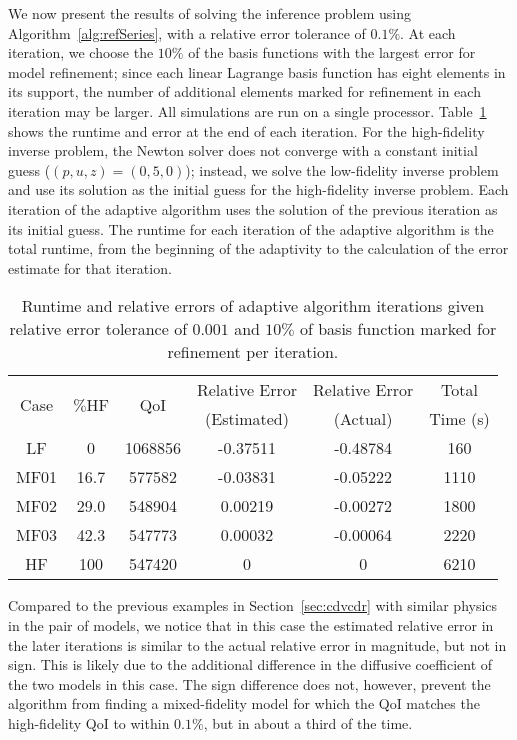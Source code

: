 We now present the results of solving the inference problem using Algorithm~\ref{alg:refSeries}, with a relative error tolerance of $0.1\%$. At each iteration, we choose the $10\%$ of the basis functions with the largest error for model refinement; since each linear Lagrange basis function has eight elements in its support, the number of additional elements marked for refinement in each iteration may be larger. All simulations are run on a single processor. Table~\ref{tab:ref3D} shows the runtime and error at the end of each iteration. For the high-fidelity inverse problem, the Newton solver does not converge with a constant initial guess ($(p,u,z)=(0,5,0)$); instead, we solve the low-fidelity inverse problem and use its solution as the initial guess for the high-fidelity inverse problem. Each iteration of the adaptive algorithm uses the solution of the previous iteration as its initial guess. The runtime for each iteration of the adaptive algorithm is the total runtime, from the beginning of the adaptivity to the calculation of the error estimate for that iteration.
%
\begin{table}[h]
\centering
\begin{tabular}{c|c|c|c|c|c}
\multirow{2}{*}{Case} & \multirow{2}{*}{$\%$HF} & \multirow{2}{*}{QoI} & Relative Error & Relative Error & Total \\ 
& & & (Estimated) & (Actual) & Time (s) \\ \hline
LF   & 0    & 1068856 & -0.37511 & -0.48784 & 160 \\
MF01 & 16.7 & 577582  & -0.03831 & -0.05222 & 1110 \\
MF02 & 29.0 & 548904  & 0.00219  & -0.00272 & 1800 \\
MF03 & 42.3 & 547773  & 0.00032  & -0.00064 & 2220 \\
HF   & 100  & 547420  & 0        & 0        & 6210 \\
\end{tabular}
\caption{Runtime and relative errors of adaptive algorithm iterations given relative error tolerance of $0.001$ and $10\%$ of basis function marked for refinement per iteration.}
\label{tab:ref3D}
\end{table}
%
Compared to the previous examples in Section~\ref{sec:cdvcdr} with similar physics in the pair of models, we notice that in this case the estimated relative error in the later iterations is similar to the actual relative error in magnitude, but not in sign. This is likely due to the additional difference in the diffusive coefficient of the two models in this case. The sign difference does not, however, prevent the algorithm from finding a mixed-fidelity model for which the QoI matches the high-fidelity QoI to within $0.1\%$, but in about a third of the time. %

